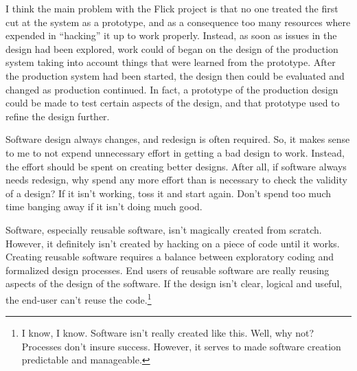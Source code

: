 {I think the main problem with the Flick project is that no one treated the
first cut at the system as a prototype, and as a consequence too many resources
where expended in ``hacking'' it up to work properly.  Instead, as soon as
issues in the design had been explored, work could of began on the design of
the production system taking into account things that were learned from the
prototype.  After the production system had been started, the design then could
be evaluated and changed as production continued.  In fact, a prototype of the
production design could be made to test certain aspects of the design, and that
prototype used to refine the design further.

Software design always changes, and redesign is often required.  So, it makes
sense to me to not expend unnecessary effort in getting a bad design to work.
Instead, the effort should be spent on creating better designs.  After all, if
software always needs redesign, why spend any more effort than is necessary to
check the validity of a design?  If it isn't working, toss it and start again.
Don't spend too much time banging away if it isn't doing much good.

Software, especially reusable software, isn't magically created from scratch.
However, it definitely isn't created by hacking on a piece of code until it
works.  Creating reusable software requires a balance between exploratory
coding and formalized design processes.  End users of reusable software are
really reusing aspects of the design of the software.  If the design isn't
clear, logical and useful, the end-user can't reuse the code.\footnote{I know,
I know.  Software isn't really created like this.  Well, why not?  Processes
don't insure success.  However, it serves to made software creation predictable
and manageable.}
}%

%



